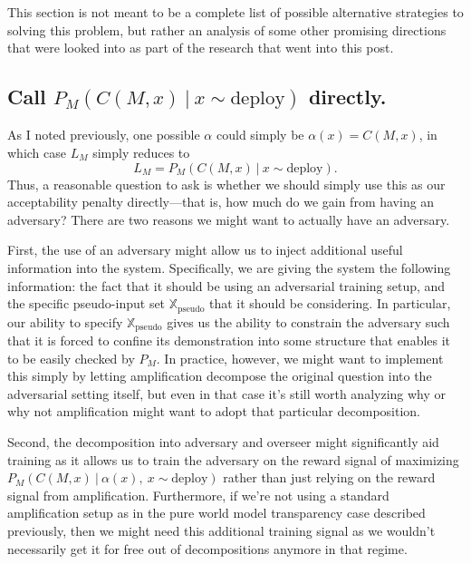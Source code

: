 \documentclass{amsart}
\begin{document}
This section is not meant to be a complete list of possible alternative strategies to solving this problem, but rather an analysis of some other promising directions that were looked into as part of the research that went into this post.

\subsection{Call $P_M(C(M, x)\ |\ x \sim \text{deploy})$ directly.} As I noted previously, one possible $\alpha$ could simply be $\alpha(x) = C(M, x)$, in which case $L_M$ simply reduces to
\[
    L_M = P_M(C(M, x)\ |\ x \sim \text{deploy}).
\]
Thus, a reasonable question to ask is whether we should simply use this as our acceptability penalty directly---that is, how much do we gain from having an adversary? There are two reasons we might want to actually have an adversary.

First, the use of an adversary might allow us to inject additional useful information into the system. Specifically, we are giving the system the following information: the fact that it should be using an adversarial training setup, and the specific pseudo-input set $\mathbb X_\text{pseudo}$ that it should be considering. In particular, our ability to specify $\mathbb X_\text{pseudo}$ gives us the ability to constrain the adversary such that it is forced to confine its demonstration into some structure that enables it to be easily checked by $P_M$. In practice, however, we might want to implement this simply by letting amplification decompose the original question into the adversarial setting itself, but even in that case it's still worth analyzing why or why not amplification might want to adopt that particular decomposition.

Second, the decomposition into adversary and overseer might significantly aid training as it allows us to train the adversary on the reward signal of maximizing $P_M(C(M, x)\ |\ \alpha(x),~ x \sim \text{deploy})$ rather than just relying on the reward signal from amplification. Furthermore, if we're not using a standard amplification setup as in the pure world model transparency case described previously, then we might need this additional training signal as we wouldn't necessarily get it for free out of decompositions anymore in that regime.
\end{document}
